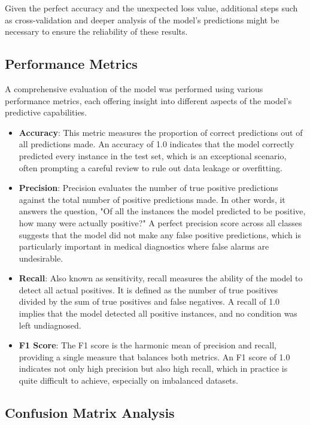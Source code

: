 \documentclass{report}
\begin{document}
Given the perfect accuracy and the unexpected loss value, additional steps such as cross-validation and deeper analysis of the model's predictions might be necessary to ensure the reliability of these results.

\subsection{Performance Metrics}

A comprehensive evaluation of the model was performed using various performance metrics, each offering insight into different aspects of the model's predictive capabilities.

\begin{itemize}
    \item \textbf{Accuracy}: This metric measures the proportion of correct predictions out of all predictions made. An accuracy of 1.0 indicates that the model correctly predicted every instance in the test set, which is an exceptional scenario, often prompting a careful review to rule out data leakage or overfitting.
    
    \item \textbf{Precision}: Precision evaluates the number of true positive predictions against the total number of positive predictions made. In other words, it answers the question, "Of all the instances the model predicted to be positive, how many were actually positive?" A perfect precision score across all classes suggests that the model did not make any false positive predictions, which is particularly important in medical diagnostics where false alarms are undesirable.
    
    \item \textbf{Recall}: Also known as sensitivity, recall measures the ability of the model to detect all actual positives. It is defined as the number of true positives divided by the sum of true positives and false negatives. A recall of 1.0 implies that the model detected all positive instances, and no condition was left undiagnosed.
    
    \item \textbf{F1 Score}: The F1 score is the harmonic mean of precision and recall, providing a single measure that balances both metrics. An F1 score of 1.0 indicates not only high precision but also high recall, which in practice is quite difficult to achieve, especially on imbalanced datasets.
\end{itemize}

\subsection{Confusion Matrix Analysis}
\end{document}

